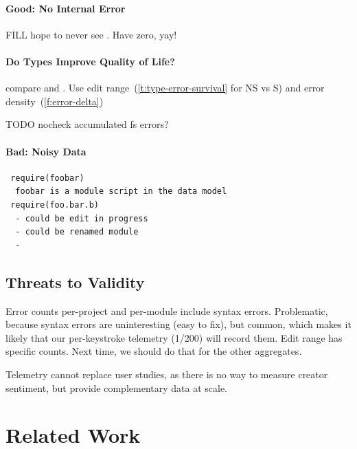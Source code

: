 \documentclass[english,submission,cleveref]{programming}
\begin{document}
\paragraph{Good: No Internal Error}

FILL hope to never see .
Have zero, yay!


\paragraph{Do Types Improve Quality of Life?}

\FILL{} compare \mnonstrict{} and \mstrict{}.
Use edit range~(\cref{t:type-error-survival} for NS vs S)
and error density~(\cref{f:error-delta})

TODO nocheck accumulated fs errors?



\paragraph{Bad: Noisy Data}

\begin{verbatim}
 require(foobar)
  foobar is a module script in the data model
 require(foo.bar.b)
  - could be edit in progress
  - could be renamed module
  - 
\end{verbatim}



\subsection{Threats to Validity}
\label{s:threats}

Error counts per-project and per-module include syntax errors.
Problematic, because syntax errors are uninteresting (easy to fix),
but common, which makes it likely that our per-keystroke telemetry (1/200) will record them.
Edit range has specific counts.
Next time, we should do that for the other aggregates.

Telemetry cannot replace user studies, as there is no way to measure
creator sentiment, but provide complementary data at scale.


\section{Related Work}
\label{s:related}
\end{document}
